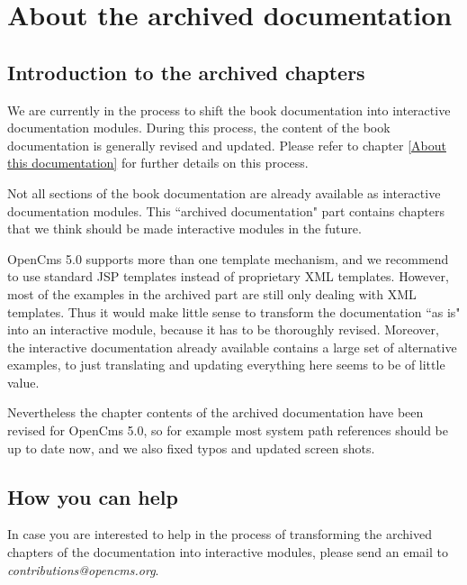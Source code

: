 \chapter{About the archived documentation}
\label{About the archived documentation}

\section{Introduction to the archived chapters}

We are currently in the process to shift the book documentation
into interactive documentation modules. During this process, the
content of the book documentation is generally revised and updated.
Please refer to chapter \ref{About this documentation} for further details on this process.

Not all sections of the book documentation are already available
as interactive documentation modules.
This ``archived documentation" part contains chapters that
we think should be made interactive modules in the future. 

OpenCms 5.0 supports more than one template mechanism, and we 
recommend to use standard JSP templates instead of proprietary XML templates. 
However, most of the examples in the archived part are still only 
dealing with XML templates. 
Thus it would make little sense
to transform the documentation ``as is" into an interactive module,
because it has to be thoroughly revised. 
Moreover, the interactive documentation already available 
contains a large set of alternative examples,
to just translating and updating everything here seems to be of little value.

Nevertheless the chapter contents of the archived documentation
have been revised for OpenCms 5.0,
so for example most system path references should be up to date now,
and we also fixed typos and updated screen shots.

\section{How you can help}

In case you are interested to help in the process of transforming the 
archived chapters of the documentation into interactive modules, 
please send an email to {\em contributions@opencms.org}.